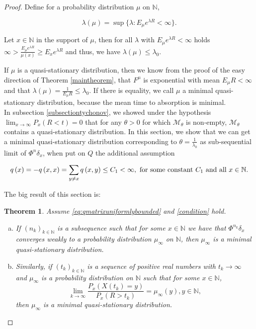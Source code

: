 \documentclass[12pt,a4paper]{scrartcl}
\newtheorem{theorem}{Theorem}[section]
\numberwithin{equation}{section}
\newcommand{\N}{\mathbb{N}} %
\begin{document}
\begin{proof}
Define for a probability distribution $\mu$ on $\N$,

\begin{equation}
\lambda\left(\mu\right) = \sup\lbrace \lambda : E_{\mu} e^{\lambda R} < \infty \rbrace .
\end{equation}

Let $x \in \N$ in the support of $\mu$, then for all $\lambda$ with $E_{\mu} e^{\lambda R} < \infty$ holds $ \infty > \frac{E_{\mu} e^{\lambda R} }{\mu\left(x\right)} \geq E_x e^{\lambda R}$ and thus, we have $\lambda\left(\mu\right) \leq \lambda_0$.

If $\mu$ is a quasi-stationary distribution, then we know from the proof of the easy direction of Theorem \ref{maintheorem}, that $F^{\mu}$ is exponential with mean $E_{\mu} R < \infty$ and that $\lambda\left(\mu\right) = \frac{1}{E_{\mu} R} \leq \lambda_0.$ If there is equality, we call $\mu$ a minimal quasi-stationary distribution, because the mean time to absorption is minimal. \\[2ex]

In subsection \ref{subsectiontychonov}, we showed under the hypothesis $\lim_{x \to \infty} P_x\left(R < t\right) = 0$ that for any $\theta > 0$ for which $\mathcal{M}_{\theta}$ is non-empty, $\mathcal{M}_{\theta}$ contains a quasi-stationary distribution. In this section, we show that we can get a minimal quasi-stationary distribution corresponding to $\theta = \frac{1}{\lambda_0}$ as sub-sequential limit of $\Phi^n\delta_x$, when put on $Q$ the additional assumption

\begin{equation} \label{eq:qmatrixuniformlybounded}
q\left(x\right) = -q\left(x,x\right) = \sum_{y \neq x} q\left(x,y\right) \leq C_1 < \infty, \textnormal{ for some constant } C_1 \textnormal{ and all } x \in \N.
\end{equation}

The big result of this section is:
\begin{theorem} \label{maintheoremminimalqsd}
Assume \eqref{eq:qmatrixuniformlybounded} and \eqref{condition} hold.
\begin{enumerate} [(a)]
\item If $\left(n_k\right)_{k \in \N}$ is a subsequence such that for some $x \in \N$ we have that $\Phi^{n_k}\delta_x$ converges weakly to a probability distribution $\mu_{\infty}$ on $\N$, then $\mu_{\infty}$ is a minimal quasi-stationary distribution.
\item Similarly, if $\left(t_k\right)_{k \in \N}$ is a sequence of positive real numbers with $t_k \to \infty$ and $\mu_{\infty}$ is a probability distribution on $\N$ such that for some $x \in \N$,
\begin{equation} \label{eq:minimalqsdalongtk}
\lim_{k \to \infty} \frac{P_x\left(X\left(t_k\right) = y\right)}{P_x\left(R > t_k\right)} = \mu_{\infty}\left(y\right), y \in \N,
\end{equation}
then $\mu_{\infty}$ is a minimal quasi-stationary distribution.
\end{enumerate}
\end{theorem}


\end{proof}
\end{document}
